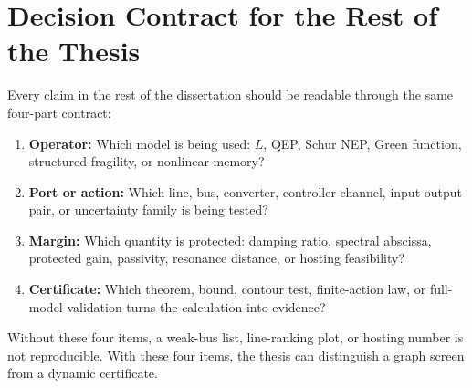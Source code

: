 \section{Decision Contract for the Rest of the Thesis}

Every claim in the rest of the dissertation should be readable through the
same four-part contract:
\begin{enumerate}
\item \textbf{Operator:} Which model is being used: \(L\), QEP, Schur NEP,
Green function, structured fragility, or nonlinear memory?
\item \textbf{Port or action:} Which line, bus, converter, controller channel,
input-output pair, or uncertainty family is being tested?
\item \textbf{Margin:} Which quantity is protected: damping ratio, spectral
abscissa, protected gain, passivity, resonance distance, or hosting feasibility?
\item \textbf{Certificate:} Which theorem, bound, contour test, finite-action
law, or full-model validation turns the calculation into evidence?
\end{enumerate}
Without these four items, a weak-bus list, line-ranking plot, or hosting number
is not reproducible. With these four items, the thesis can distinguish a graph
screen from a dynamic certificate.

\FloatBarrier
